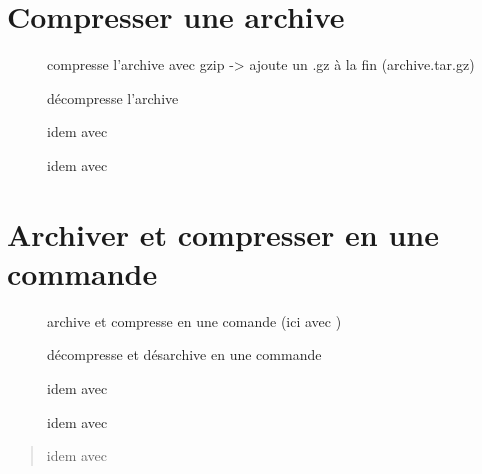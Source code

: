 \documentclass[letterpaper,10pt,french]{sphinxmanual}
\begin{document}
\section{Compresser une archive}
\label{\detokenize{15-archiver:compresser-une-archive}}\begin{description}
\item[{}] \leavevmode
compresse l’archive avec gzip -\textgreater{} ajoute un .gz à la fin (archive.tar.gz)

\item[{}] \leavevmode
décompresse l’archive

\item[{}] \leavevmode
idem avec 

\item[{}] \leavevmode
idem avec 

\end{description}


\section{Archiver et compresser en une commande}
\label{\detokenize{15-archiver:archiver-et-compresser-en-une-commande}}\begin{description}
\item[{}] \leavevmode
archive et compresse en une comande (ici avec )

\item[{}] \leavevmode
décompresse et désarchive en une commande

\item[{}] \leavevmode
idem avec 

\item[{}] \leavevmode
idem avec 

\end{description}

\begin{quote}

idem avec 
\end{quote}
\end{document}
